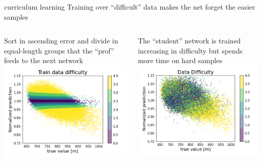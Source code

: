 \documentclass{beamer}
\begin{document}
\begin{frame}{curriculum learning}
    Training over ``difficult'' data makes the net forget the easier samples
    \vfill
    \begin{columns}
        \begin{column}{.5\textwidth}
            Sort in ascending error and divide in equal-length groups that the ``prof'' feeds to the next network
            \includegraphics[width=\textwidth]{figures/curriculum_before.png}
        \end{column}
        \begin{column}{.5\textwidth}
            The ``student'' network is trained increasing in difficulty but spends more time on 
            hard samples
            \includegraphics[width=\textwidth]{figures/curriculum_after.png}
        \end{column}
    \end{columns}
\end{frame}
\end{document}
